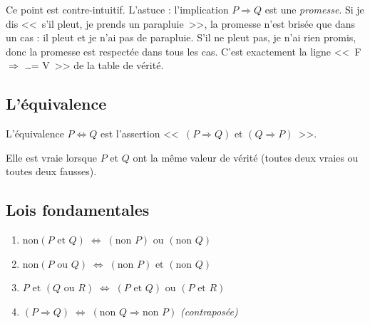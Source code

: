 \begin{intuitionbox}
Ce point est contre-intuitif. L'astuce : l'implication $P \Rightarrow Q$ est une \emph{promesse}. Si je dis <<~s'il pleut, je prends un parapluie~>>, la promesse n'est brisée que dans un cas : il pleut et je n'ai pas de parapluie. S'il ne pleut pas, je n'ai rien promis, donc la promesse est respectée dans tous les cas. C'est exactement la ligne <<~F $\Rightarrow$ \dots = V~>> de la table de vérité.
\end{intuitionbox}

\subsection{L'équivalence}

\begin{defbox}[--- Équivalence]
L'équivalence $P \Leftrightarrow Q$ est l'assertion <<~$(P \Rightarrow Q)$ et $(Q \Rightarrow P)$~>>.

Elle est vraie lorsque $P$ et $Q$ ont la même valeur de vérité (toutes deux vraies ou toutes deux fausses).
\end{defbox}

\subsection{Lois fondamentales}

\begin{propbox}
\begin{enumerate}[leftmargin=1.5cm]
  \item $\text{non}(P \text{ et } Q) \;\Leftrightarrow\; (\text{non } P) \text{ ou } (\text{non } Q)$
  \item $\text{non}(P \text{ ou } Q) \;\Leftrightarrow\; (\text{non } P) \text{ et } (\text{non } Q)$
  \item $P \text{ et } (Q \text{ ou } R) \;\Leftrightarrow\; (P \text{ et } Q) \text{ ou } (P \text{ et } R)$
  \item $(P \Rightarrow Q) \;\Leftrightarrow\; (\text{non } Q \Rightarrow \text{non } P)$ \quad \textit{(contraposée)}
\end{enumerate}
\end{propbox}

